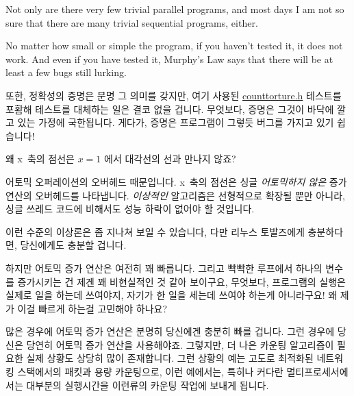 \begin{enumerate}
	Not only are there very few
	trivial parallel programs, and most days I am
	not so sure that there are many trivial sequential programs, either.

	No matter how small or simple the program, if you haven't tested
	it, it does not work.
	And even if you have tested it, Murphy's Law says that there will
	be at least a few bugs still lurking.
	\fi

	또한, 정확성의 증명은 분명 그 의미를 갖지만, 여기 사용된
	\url{counttorture.h} 테스트를 포홤해 테스트를 대체하는 일은 결코 없을
	겁니다.
	무엇보다, 증명은 그것이 바닥에 깔고 있는 가정에 국한됩니다.
	게다가, 증명은 프로그램이 그렇듯 버그를 가지고 있기 쉽습니다!

\QuickQ{}
	왜 x~축의 점선은 $x=1$ 에서 대각선의 선과 만나지 않죠?

\QuickA{}
	어토믹 오퍼레이션의 오버헤드 때문입니다.
	x~축의 점선은 싱글 \emph{어토믹하지 않은} 증가 연산의 오버헤드를
	나타냅니다.
	\emph{이상적인} 알고리즘은 선형적으로 확장될 뿐만 아니라,
	싱글 쓰레드 코드에 비해서도 성능 하락이 없어야 할 것입니다.

	이런 수준의 이상론은 좀 지나쳐 보일 수 있습니다, 다만 리누스 토발즈에게
	충분하다면, 당신에게도 충분할 겁니다.

\QuickQ{}
	하지만 어토믹 증가 연산은 여전히 꽤 빠릅니다.
	그리고 빡빡한 루프에서 하나의 변수를 증가시키는 건 제겐 꽤 비현실적인
	것 같아 보이구요, 무엇보다, 프로그램의 실행은 실제로 일을 하는데
	쓰여야지, 자기가 한 일을 세는데 쓰여야 하는게 아니라구요!
	왜 제가 이걸 빠르게 하는걸 고민해야 하나요?

\QuickA{}
	많은 경우에 어토믹 증가 연산은 분명히 당신에겐 충분히 빠를 겁니다.
	그런 경우에 당신은 당연히 어토믹 증가 연산을 사용해야죠.
	그렇지만, 더 나은 카운팅 알고리즘이 필요한 실제 상황도 상당히 많이
	존재합니다.
	그런 상황의 예는 고도로 최적화된 네트워킹 스택에서의 패킷과 용량
	카운팅으로, 이런 예에서는, 특히나 커다란 멀티프로세서에서는 대부분의
	실행시간을 이런류의 카운팅 작업에 보내게 됩니다.


\end{enumerate}

